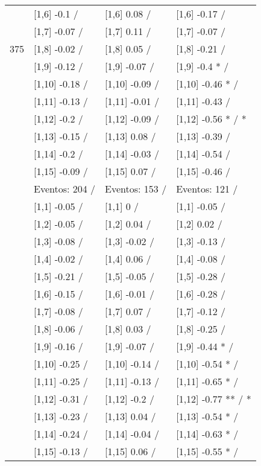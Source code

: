\begin{table}
\begin{tabular}[t]{llll}
 & {}[1,6] -0.1  / & {}[1,6] 0.08  / & {}[1,6] -0.17  /\\
 & {}[1,7] -0.07  / & {}[1,7] 0.11  / & {}[1,7] -0.07  /\\
375 & {}[1,8] -0.02  / & {}[1,8] 0.05  / & {}[1,8] -0.21  /\\
\addlinespace
 & {}[1,9] -0.12  / & {}[1,9] -0.07  / & {}[1,9] -0.4 * /\\
 & {}[1,10] -0.18  / & {}[1,10] -0.09  / & {}[1,10] -0.46 * /\\
 & {}[1,11] -0.13  / & {}[1,11] -0.01  / & {}[1,11] -0.43  /\\
 & {}[1,12] -0.2  / & {}[1,12] -0.09  / & {}[1,12] -0.56 * / *\\
 & {}[1,13] -0.15  / & {}[1,13] 0.08  / & {}[1,13] -0.39  /\\
\addlinespace
 & {}[1,14] -0.2  / & {}[1,14] -0.03  / & {}[1,14] -0.54  /\\
 & {}[1,15] -0.09  / & {}[1,15] 0.07  / & {}[1,15] -0.46  /\\
 & Eventos:  204 / & Eventos:  153 / & Eventos:  121 /\\
 & {}[1,1] -0.05  / & {}[1,1] 0  / & {}[1,1] -0.05  /\\
 & {}[1,2] -0.05  / & {}[1,2] 0.04  / & {}[1,2] 0.02  /\\
\addlinespace
 & {}[1,3] -0.08  / & {}[1,3] -0.02  / & {}[1,3] -0.13  /\\
 & {}[1,4] -0.02  / & {}[1,4] 0.06  / & {}[1,4] -0.08  /\\
 & {}[1,5] -0.21  / & {}[1,5] -0.05  / & {}[1,5] -0.28  /\\
 & {}[1,6] -0.15  / & {}[1,6] -0.01  / & {}[1,6] -0.28  /\\
 & {}[1,7] -0.08  / & {}[1,7] 0.07  / & {}[1,7] -0.12  /\\
\addlinespace
500 & {}[1,8] -0.06  / & {}[1,8] 0.03  / & {}[1,8] -0.25  /\\
 & {}[1,9] -0.16  / & {}[1,9] -0.07  / & {}[1,9] -0.44 * /\\
 & {}[1,10] -0.25  / & {}[1,10] -0.14  / & {}[1,10] -0.54 * /\\
 & {}[1,11] -0.25  / & {}[1,11] -0.13  / & {}[1,11] -0.65 * /\\
 & {}[1,12] -0.31  / & {}[1,12] -0.2  / & {}[1,12] -0.77 ** / *\\
\addlinespace
 & {}[1,13] -0.23  / & {}[1,13] 0.04  / & {}[1,13] -0.54 * /\\
 & {}[1,14] -0.24  / & {}[1,14] -0.04  / & {}[1,14] -0.63 * /\\
 & {}[1,15] -0.13  / & {}[1,15] 0.06  / & {}[1,15] -0.55 * /\\
\bottomrule
\end{tabular}
\end{table}
